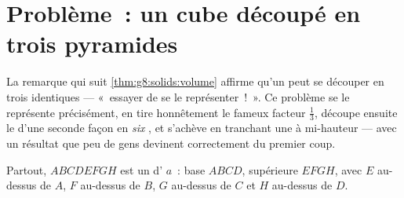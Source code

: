 \section{Problème~: un cube découpé en trois pyramides}

\begin{problem}
\label{pb:g8:solids:1}
La remarque qui suit \cref{thm:g8:solids:volume} affirme qu'un 
peut se découper en trois  identiques --- «~essayer de se le
représenter~!~». Ce problème se le représente précisément, en tire
honnêtement le fameux facteur $\frac13$, découpe ensuite le 
d'une seconde façon en \emph{six} , et s'achève en tranchant
une  à mi-hauteur --- avec un résultat que peu de gens
devinent correctement du premier coup.

Partout, $ABCDEFGH$ est un  d' $a$~: base $ABCD$, 
supérieure $EFGH$, avec $E$ au-dessus de $A$, $F$ au-dessus de $B$,
$G$ au-dessus de $C$ et $H$ au-dessus de $D$.


\end{problem}
